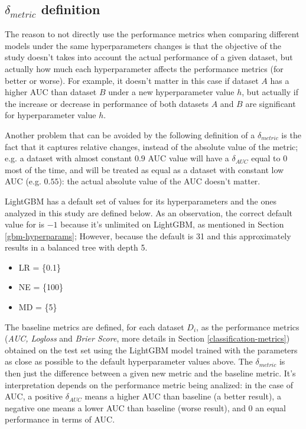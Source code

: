\subsection{\texorpdfstring{$\delta_{metric}$}{delta} definition}

The reason to not directly use the performance metrics when comparing different models under the same hyperparameters changes is that the objective of the study doesn't takes into account the actual performance of a given dataset, but actually how much each hyperparameter affects the performance metrics (for better or worse). For example, it doesn't matter in this case if dataset $A$ has a higher AUC than dataset $B$ under a new hyperparameter value $h$, but actually if the increase or decrease in performance of both datasets $A$ and $B$ are significant for hyperparameter value $h$. 

Another problem that can be avoided by the following definition of a $\delta_{metric}$ is the fact that it captures relative changes, instead of the absolute value of the metric; e.g. a dataset with almost constant $0.9$ AUC value will have a $\delta_{AUC}$ equal to $0$ most of the time, and will be treated as equal as a dataset with constant low AUC (e.g. $0.55$): the actual absolute value of the AUC doesn't matter.

LightGBM has a default set of values for its hyperparameters and the ones analyzed in this study  are defined below. As an observation, the correct default value for  is $-1$ because it's unlimited on LightGBM, as mentioned in Section \ref{gbm-hyperparams}; However, because the  default is 31 and this approximately results in a balanced tree with depth 5.

\begin{itemize}
    \item LR = \{0.1\}
    \item NE = \{100\}
    \item MD = \{5\}
\end{itemize}

The baseline metrics are defined, for each dataset $D_i$, as the performance metrics (\textit{AUC, Logloss} and \textit{Brier Score}, more details in Section \ref{classification-metrics}) obtained on the test set using the LightGBM model trained with the parameters as close as possible to the default hyperparameter values above. The $\delta_{metric}$ is then just the difference between a given new metric and the baseline metric. It's interpretation depends on the performance metric being analized: in the case of AUC, a positive $\delta_{AUC}$ means a higher AUC than baseline (a better result), a negative one means a lower AUC than baseline (worse result), and $0$ an equal performance in terms of AUC.


